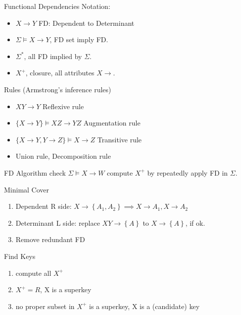 \documentclass[a4paper]{article}
\begin{document}
\begin{multicols}{3}
\begin{cheatsheetblock}{ Functional Dependencies}
    Notation:
    \begin{itemize}
        \item $X \rightarrow Y$ \hfill FD: Dependent to Determinant
        \item $\Sigma \models X \rightarrow Y$, \hfill FD set imply FD.
        \item $\Sigma^*$, \hfill all FD implied by $\Sigma$.
        \item $X^+$, \hfill closure, all attributes $X \rightarrow$.
    \end{itemize}
    Rules (Armstrong’s inference rules)
    \begin{itemize}
        \item $X Y \rightarrow Y$ \hfill Reﬂexive rule
        \item $\{X \rightarrow Y\} \models X Z \rightarrow Y Z$ \hfill Augmentation rule
        \item $\{X \rightarrow Y, Y \rightarrow Z\} \models X \rightarrow Z$ \hfill Transitive rule
        \item Union rule, Decomposition rule
    \end{itemize}
\end{cheatsheetblock}

\begin{cheatsheetblock}{FD Algorithm}
    check $\Sigma \models X \rightarrow W$ \hfill compute $X^+$ by repeatedly apply FD in $\Sigma$.
\end{cheatsheetblock}

\begin{cheatsheetblock}{Minimal Cover}
    \begin{enumerate}
        \item Dependent R side: $X \rightarrow\left\{A_1, A_2\right\} \implies X \rightarrow A_1, X \rightarrow A_2$
        \item Determinant L side: replace $XY \rightarrow \left\{A\right\}$ to $X \rightarrow \left\{A\right\}$, if ok.
        \item Remove redundant FD
    \end{enumerate}
\end{cheatsheetblock}

\begin{cheatsheetblock}{Find Keys}
    \begin{enumerate}
        \item compute all $X^+$
        \item $X^+ = R$, X is a superkey
        \item no proper subset in $X^+$ is a superkey, X is a (candidate) key
    \end{enumerate}


\end{cheatsheetblock}
\end{multicols}
\end{document}
